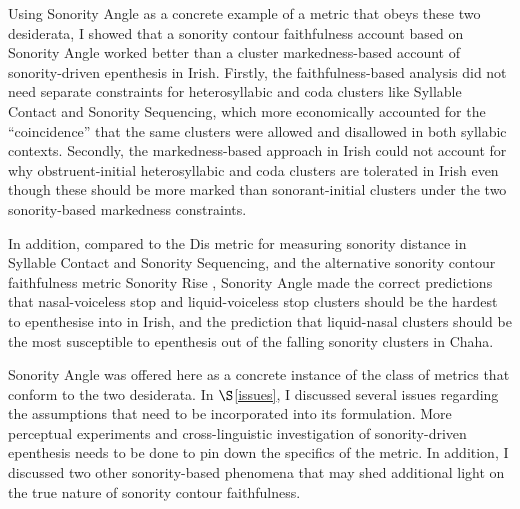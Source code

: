 \documentclass[12pt]{article}
\begin{document}
Using {\sc Sonority Angle} as a concrete example of a metric that obeys these two desiderata, I showed that  a sonority contour faithfulness account based on {\sc Sonority Angle} worked better than a cluster markedness-based account of sonority-driven epenthesis in Irish. Firstly, the faithfulness-based analysis did not need separate constraints for heterosyllabic and coda clusters like Syllable Contact and Sonority Sequencing, which more economically accounted for the ``coincidence'' that the same clusters were allowed and disallowed in both syllabic contexts. Secondly, the markedness-based approach in Irish could not account for why obstruent-initial heterosyllabic and coda clusters are tolerated in Irish even though these should be more marked than sonorant-initial clusters under the two sonority-based markedness constraints.

In addition, compared to the {\sc *Dis} metric \citep{gouskova.2002} for measuring sonority distance in Syllable Contact and Sonority Sequencing, and the alternative sonority contour faithfulness metric {\sc Sonority Rise} \citep{flemming.2008}, {\sc Sonority Angle} made the correct predictions that nasal-voiceless stop and liquid-voiceless stop clusters should be the hardest to epenthesise into in Irish, and the prediction that liquid-nasal clusters should be the most susceptible to epenthesis out of the falling sonority clusters in Chaha.

{\sc Sonority Angle} was offered here as a concrete instance of the class of metrics that conform to the two desiderata. In $\S$\ref{issues}, I discussed several issues regarding the assumptions that need to be incorporated into its formulation. More perceptual experiments and cross-linguistic investigation of sonority-driven epenthesis needs to be done to pin down the specifics of the metric. In addition, I discussed two other sonority-based phenomena that may shed additional light on the true nature of sonority contour faithfulness.



\end{document}
